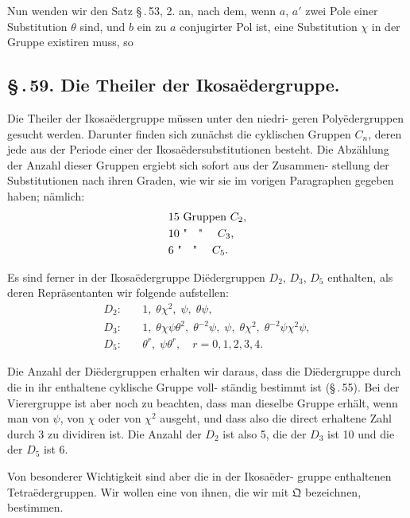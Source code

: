 \documentclass[12pt,a4paper]{article}
\theoremstyle{plain}
\theoremstyle{definition}
\theoremstyle{remark}
\newcommand{\sect}[1]{\S\,.\,#1.}
\begin{document}
Nun wenden wir den Satz \S\,.\,53, 2. an, nach dem, wenn $a$, $a'$
zwei Pole einer Substitution $\theta$ sind, und $b$ ein zu $a$ conjugirter
Pol ist, eine Substitution $\chi$ in der Gruppe existiren muss, so


\subsection*{\sect{59} Die Theiler der Ikosa\"edergruppe.}

Die Theiler der Ikosa\"edergruppe m\"ussen unter den niedri-
geren Poly\"edergruppen gesucht werden. Darunter finden sich
zun\"achst die cyklischen Gruppen $C_n$, deren jede aus der Periode
einer der Ikosa\"edersubstitutionen besteht. Die Abz\"ahlung der
Anzahl dieser Gruppen ergiebt sich sofort aus der Zusammen-
stellung der Substitutionen nach ihren Graden, wie wir sie im
vorigen Paragraphen gegeben haben; n\"amlich:
\begin{align*}
&15\ \text{Gruppen}\ C_2,\\
&10\ \text{"\quad"\quad}\ C_3,\\
&6\ \text{"\quad"\quad}\ C_5.
\end{align*}

Es sind ferner in der Ikosa\"edergruppe Di\"edergruppen
$D_2$, $D_3$, $D_5$ enthalten, als deren Repr\"asentanten wir folgende
aufstellen:
\begin{align*}
D_2:&\quad 1,\; \theta\chi^2,\; \psi,\; \theta\psi,\\
D_3:&\quad 1,\; \theta\chi\psi\theta^2,\; \theta^{-2}\psi,\; \psi,\; \theta\chi^2,\; \theta^{-2}\psi\chi^2\psi,\\
D_5:&\quad \theta^r,\; \psi\theta^r,\quad r = 0, 1, 2, 3, 4.
\end{align*}

Die Anzahl der Di\"edergruppen erhalten wir daraus, dass die
Di\"edergruppe durch die in ihr enthaltene cyklische Gruppe voll-
st\"andig bestimmt ist (\S\,.\,55). Bei der Vierergruppe ist aber
noch zu beachten, dass man dieselbe Gruppe erh\"alt, wenn man
von $\psi$, von $\chi$ oder von $\chi^2$ ausgeht, und dass also die direct
erhaltene Zahl durch 3 zu dividiren ist. Die Anzahl der $D_2$ ist
also 5, die der $D_3$ ist 10 und die der $D_5$ ist 6.

Von besonderer Wichtigkeit sind aber die in der Ikosa\"eder-
gruppe enthaltenen Tetra\"edergruppen. Wir wollen eine von
ihnen, die wir mit $\mathfrak{Q}$ bezeichnen, bestimmen.
\end{document}
